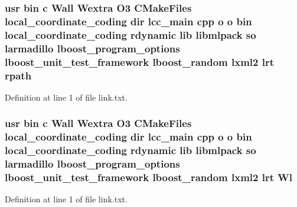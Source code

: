 \subsubsection[{rpath}]{\setlength{\rightskip}{0pt plus 5cm}usr bin c Wall Wextra O3 C\-Make\-Files local\-\_\-coordinate\-\_\-coding dir lcc\-\_\-main cpp o o bin local\-\_\-coordinate\-\_\-coding rdynamic lib libmlpack so larmadillo lboost\-\_\-program\-\_\-options lboost\-\_\-unit\-\_\-test\-\_\-framework lboost\-\_\-random lxml2 lrt rpath}\label{methods_2local__coordinate__coding_2CMakeFiles_2local__coordinate__coding_8dir_2link_8txt_af81d06af386da766da0c408518ee3be5}


Definition at line 1 of file link.\-txt.

\subsubsection[{Wl}]{\setlength{\rightskip}{0pt plus 5cm}usr bin c Wall Wextra O3 C\-Make\-Files local\-\_\-coordinate\-\_\-coding dir lcc\-\_\-main cpp o o bin local\-\_\-coordinate\-\_\-coding rdynamic lib libmlpack so larmadillo lboost\-\_\-program\-\_\-options lboost\-\_\-unit\-\_\-test\-\_\-framework lboost\-\_\-random lxml2 lrt Wl}\label{methods_2local__coordinate__coding_2CMakeFiles_2local__coordinate__coding_8dir_2link_8txt_a81f8f4a511944bdb600dbaae20dce603}


Definition at line 1 of file link.\-txt.

